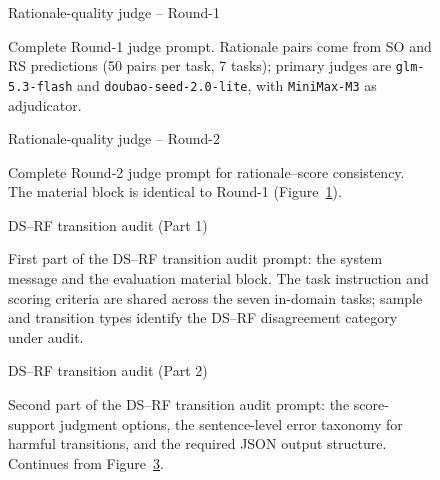 
\clearpage
\begin{figure}[t]
\begin{promptboxbig}{Rationale-quality judge -- Round-1}
  \ptext{\JudgeQualityRoundOne}
\end{promptboxbig}
\caption{Complete Round-1 judge prompt. Rationale pairs come from SO and RS
predictions (50 pairs per task, 7 tasks); primary judges are
\texttt{glm-5.3-flash} and \texttt{doubao-seed-2.0-lite}, with
\texttt{MiniMax-M3} as adjudicator.}
\label{fig:judge-r1}
\end{figure}

\clearpage
\begin{figure}[t]
\begin{promptboxbig}{Rationale-quality judge -- Round-2}
  \ptext{\JudgeQualityRoundTwo}
\end{promptboxbig}
\caption{Complete Round-2 judge prompt for rationale--score consistency.
The material block is identical to Round-1 (Figure~\ref{fig:judge-r1}).}
\label{fig:judge-r2}
\end{figure}


\clearpage
\begin{figure}[t]
\begin{promptboxbig}{DS--RF transition audit (Part 1)}
  \ptext{\TransitionAuditPartOne}
\end{promptboxbig}
\caption{First part of the DS--RF transition audit prompt: the system
message and the evaluation material block. The task instruction and scoring
criteria are shared across the seven in-domain tasks; sample and transition
types identify the DS--RF disagreement category under audit.}
\label{fig:transition-audit-p1}
\end{figure}

\clearpage
\begin{figure}[t]
\begin{promptboxbig}{DS--RF transition audit (Part 2)}
  \ptext{\TransitionAuditPartTwo}
\end{promptboxbig}
\caption{Second part of the DS--RF transition audit prompt: the score-support
judgment options, the sentence-level error taxonomy for harmful transitions,
and the required JSON output structure. Continues from
Figure~\ref{fig:transition-audit-p1}.}
\label{fig:transition-audit-p2}
\end{figure}

